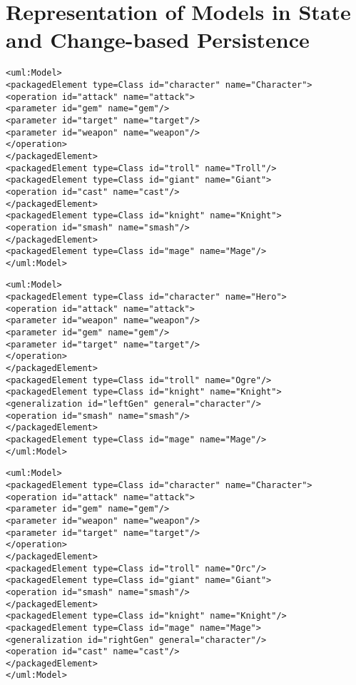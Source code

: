 \chapter{Representation of Models in State and Change-based Persistence}
\label{sec:examples_of_cbp}

\vspace{-20pt}
\begin{lstlisting}[style=xmi,caption={Simplified XMI file of the original version in Figure \ref{fig:class_diagram_origin}.},label=lst:xmimodel_origin]
<uml:Model>
<packagedElement type=Class id="character" name="Character">
<operation id="attack" name="attack">
<parameter id="gem" name="gem"/>
<parameter id="target" name="target"/>
<parameter id="weapon" name="weapon"/>
</operation>
</packagedElement>
<packagedElement type=Class id="troll" name="Troll"/>
<packagedElement type=Class id="giant" name="Giant">
<operation id="cast" name="cast"/>
</packagedElement>
<packagedElement type=Class id="knight" name="Knight">
<operation id="smash" name="smash"/>
</packagedElement>
<packagedElement type=Class id="mage" name="Mage"/>
</uml:Model>
\end{lstlisting}

\vspace{-20pt}
\begin{lstlisting}[style=xmi,caption={Simplified XMI file of the left version in Figure \ref{fig:class_diagram_left}.},label=lst:xmimodel_left]
<uml:Model>
<packagedElement type=Class id="character" name="Hero">
<operation id="attack" name="attack">
<parameter id="weapon" name="weapon"/>
<parameter id="gem" name="gem"/>
<parameter id="target" name="target"/>
</operation>
</packagedElement>
<packagedElement type=Class id="troll" name="Ogre"/>
<packagedElement type=Class id="knight" name="Knight">
<generalization id="leftGen" general="character"/>
<operation id="smash" name="smash"/>
</packagedElement>
<packagedElement type=Class id="mage" name="Mage"/>
</uml:Model>
\end{lstlisting}

\vspace{-20pt}
\begin{lstlisting}[style=xmi,caption={Simplified XMI file of the right version of Figure \ref{fig:class_diagram_right}.},label=lst:xmimodel_right]
<uml:Model>
<packagedElement type=Class id="character" name="Character">
<operation id="attack" name="attack">
<parameter id="gem" name="gem"/>
<parameter id="weapon" name="weapon"/>
<parameter id="target" name="target"/>
</operation>
</packagedElement>
<packagedElement type=Class id="troll" name="Orc"/>
<packagedElement type=Class id="giant" name="Giant">
<operation id="smash" name="smash"/>
</packagedElement>
<packagedElement type=Class id="knight" name="Knight"/>
<packagedElement type=Class id="mage" name="Mage">
<generalization id="rightGen" general="character"/>
<operation id="cast" name="cast"/>
</packagedElement>
</uml:Model>
\end{lstlisting}


